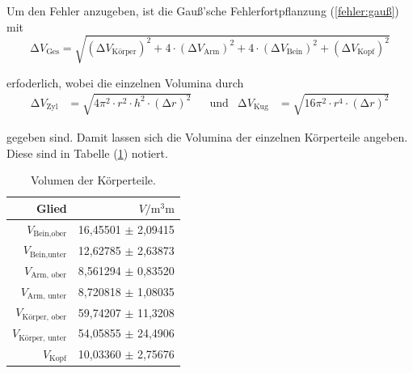 Um den Fehler anzugeben, ist die Gauß'sche Fehlerfortpflanzung (\ref{fehler:gauß}) mit
\begin{equation}
  \increment V_{\text{Ges}} = \sqrt{(\increment V_{\text{Körper}})^2 + 4 \cdot (\increment V_{\text{Arm}})^2 
    + 4 \cdot (\increment V_{\text{Bein}})^2 + (\increment V_{\text{Kopf}})^2}
\end{equation}

erfoderlich, wobei die einzelnen Volumina durch 
\begin{align*}
  \increment V_{\text{Zyl}} &= \sqrt{4 \pi^2 \cdot r^2 \cdot h^2 \cdot (\increment r)^2} & 
  &\text{und}& 
  \increment V_{\text{Kug}} &= \sqrt{16 \pi^2 \cdot r^4 \cdot (\increment r)^2}
\end{align*}

gegeben sind. Damit lassen sich die Volumina der einzelnen Körperteile angeben.
Diese sind in Tabelle (\ref{tab:VolGlieder}) notiert.



\begin{table}
  \centering
  \caption{Volumen der Körperteile.}
  \label{tab:VolGlieder}
  \begin{tabular}{rr}
  \toprule
  Glied & $V / \unit{\cubic\milli\meter}$ \\
  \midrule
  $V_{\text{Bein,ober}}$      & 16,45501 $\pm$ 2,09415 \\
  $V_{\text{Bein,unter}}$     & 12,62785 $\pm$ 2,63873 \\
  $V_{\text{Arm, ober}}$      & 8,561294 $\pm$ 0,83520 \\
  $V_{\text{Arm, unter}}$     & 8,720818 $\pm$ 1,08035 \\
  $V_{\text{Körper, ober}}$   & 59,74207 $\pm$ 11,3208 \\
  $V_{\text{Körper, unter}}$  & 54,05855 $\pm$ 24,4906 \\
  $V_{\text{Kopf}}$           & 10,03360 $\pm$ 2,75676 \\
  \bottomrule
\end{tabular}
\end{table}

